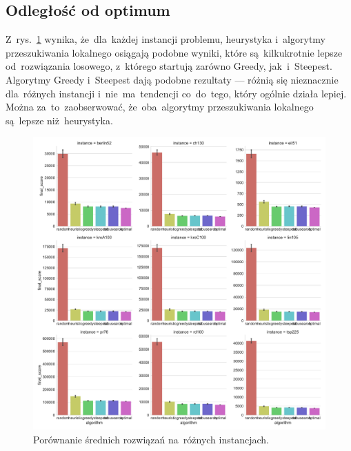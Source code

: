 \subsection{Odległość od optimum}

Z~rys.~\ref{fig:avg} wynika, że~dla~każdej instancji problemu, heurystyka i~algorytmy przeszukiwania lokalnego osiągają podobne wyniki, które są~kilkukrotnie lepsze od~rozwiązania losowego, z~którego startują zarówno Greedy, jak~i~Steepest. Algorytmy Greedy i~Steepest dają podobne rezultaty --- różnią się nieznacznie dla~różnych instancji i~nie~ma~tendencji co~do~tego, który ogólnie działa lepiej. Można za~to~zaobserwować, że~oba~algorytmy przeszukiwania lokalnego są~lepsze niż~heurystyka.

\begin{figure}[H]
\begin{center}
\includegraphics[width=1.0\textwidth]{graphs/score_comparison_bar_avg.pdf}
\end{center}
\caption{Porównanie średnich rozwiązań na~różnych instancjach.}
\label{fig:avg}
\end{figure}


